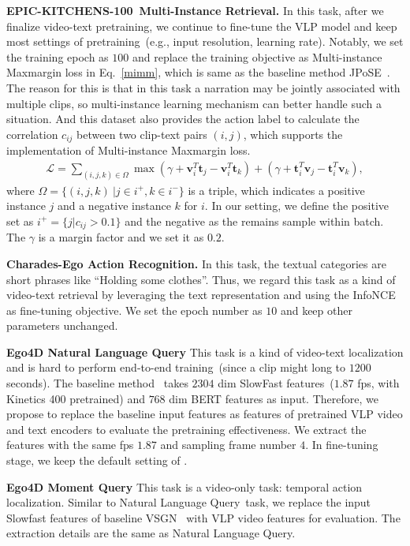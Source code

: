 \documentclass{article}
\newcommand{\epic}{EPIC-KITCHENS-100}
\newcommand{\nlq}{Natural Language Query}
\newcommand{\mq}{Moment Query}
\begin{document}
\noindent\textbf{\epic~Multi-Instance Retrieval.}
In this task, after we finalize video-text pretraining, we continue to fine-tune the VLP model and keep most settings of pretraining~(e.g., input resolution, learning rate). 
Notably, we set the training epoch as $100$ and replace the training objective as Multi-instance Maxmargin loss in Eq.~\ref{mimm}, which is same as the baseline method JPoSE~\cite{wray2019fine}.
The reason for this is that in this task a narration may be jointly associated with multiple clips, so multi-instance learning mechanism can better handle such a situation. And this dataset also provides the action label to calculate the correlation $c_{ij}$ between two clip-text pairs $(i,j)$, which supports the implementation of Multi-instance Maxmargin loss.
\begin{align}
\mathcal{L}=
\sum_{(i,j,k)\in \Omega}\max
\left( \gamma + \mathbf{v}_i^T\mathbf{t}_j
-\mathbf{v}_i^T \mathbf{t}_k \right)
+
\left( \gamma + \mathbf{t}_i^T\mathbf{v}_j
-\mathbf{t}_i^T \mathbf{v}_k \right),
\label{mimm}
\end{align}
where $\Omega=\{(i,j,k)~|j\in i^{+}, k\in i^{-}\}$ is a triple, which indicates a positive instance $j$ and a negative instance $k$ for $i$. 
In our setting, we define the positive set as $i^{+}=\{j|c_{ij}>0.1\}$ and the negative as the remains sample within batch. The $\gamma$ is a margin factor and we set it as $0.2$.

\noindent\textbf{Charades-Ego Action Recognition.}
In this task, the textual categories are short phrases like ``Holding some clothes''. 
Thus, we regard this task as a kind of video-text retrieval by leveraging the text representation and using the InfoNCE as fine-tuning objective.
We set the epoch number as $10$ and keep other parameters unchanged.

\noindent\textbf{Ego4D \nlq}
This task is a kind of video-text localization and is hard to perform end-to-end training~(since a clip might long to $1200$ seconds).
The baseline method~\cite{zhang2020span} takes $2304$ dim SlowFast features~($1.87$ fps, with Kinetics 400 pretrained) and $768$ dim BERT features as input.
Therefore, we propose to replace the baseline input features as features of pretrained VLP video and text encoders to evaluate the pretraining effectiveness.
We extract the features with the same fps $1.87$ and sampling frame number $4$.
In fine-tuning stage, we keep the default setting of \cite{zhang2020span}.

\noindent\textbf{Ego4D \mq}
This task is a video-only task: temporal action localization. Similar to \nlq~task, we replace the input Slowfast features of baseline VSGN~\cite{zhao2021video} with VLP video features for evaluation. The extraction details are the same as \nlq.
\end{document}
